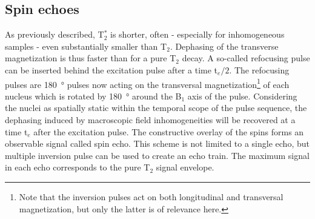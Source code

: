             \subsection{Spin echoes}
            \label{sec:theory:spinEchoes}
            As previously described, T$_2^*$ is shorter, often - especially for inhomogeneous samples - even substantially smaller than T$_2$. Dephasing of the transverse magnetization is thus faster than for a pure T$_2$ decay. A so-called refocusing pulse can be inserted  behind the excitation pulse after a time t$_e/2$. The refocusing pulses are \SI{180}{\degree} pulses now acting on the transversal magnetization\footnote[1]{Note that the inversion pulses act on both longitudinal and transversal magnetization, but only the latter is of relevance here.} of each nucleus which is rotated by \SI{180}{\degree} around the B$_1$ axis of the pulse. Considering the nuclei as spatially static within the temporal scope of the pulse sequence, the dephasing induced by macroscopic field inhomogeneities will be recovered at a time t$_e$ after the excitation pulse. The constructive overlay of the spins forms an observable signal called spin echo.
            This scheme is not limited to a single echo, but multiple inversion pulse can be used to create an echo train. The maximum signal in each echo corresponds to the pure T$_2$ signal envelope.


